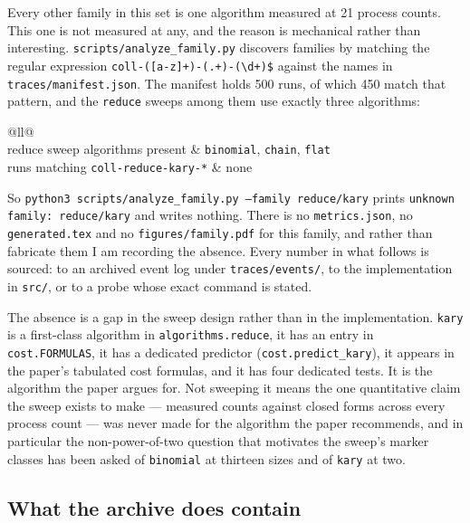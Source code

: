 \documentclass[11pt]{article}
\begin{document}
Every other family in this set is one algorithm measured at 21 process counts. This one is not
measured at any, and the reason is mechanical rather than interesting.
\texttt{scripts/analyze\_family.py} discovers families by matching the regular expression
\texttt{coll-([a-z]+)-(.+)-(\textbackslash d+)\$} against the names in
\texttt{traces/manifest.json}. The manifest holds 500 runs, of which 450 match that pattern,
and the \texttt{reduce} sweeps among them use exactly three algorithms:

\begin{center}\small
\begin{tabular}{@{}ll@{}}
\toprule
{} \\
\midrule
reduce sweep algorithms present & \texttt{binomial}, \texttt{chain}, \texttt{flat} \\
runs matching \texttt{coll-reduce-kary-*} & none \\
\bottomrule
\end{tabular}
\end{center}

So \texttt{python3 scripts/analyze\_family.py --family reduce/kary} prints
\texttt{unknown family: reduce/kary} and writes nothing. There is no \texttt{metrics.json}, no
\texttt{generated.tex} and no \texttt{figures/family.pdf} for this family, and rather than
fabricate them I am recording the absence. Every number in what follows is sourced: to an
archived event log under \texttt{traces/events/}, to the implementation in \texttt{src/}, or to
a probe whose exact command is stated.

The absence is a gap in the sweep design rather than in the implementation. \texttt{kary} is a
first-class algorithm in \texttt{algorithms.reduce}, it has an entry in
\texttt{cost.FORMULAS}, it has a dedicated predictor (\texttt{cost.predict\_kary}), it appears
in the paper's tabulated cost formulas, and it has four dedicated tests. It is the algorithm
the paper argues for. Not sweeping it means the one quantitative claim the sweep exists to
make --- measured counts against closed forms across every process count --- was never made for
the algorithm the paper recommends, and in particular the non-power-of-two question that
motivates the sweep's marker classes has been asked of \texttt{binomial} at thirteen sizes and
of \texttt{kary} at two.

\subsection*{What the archive does contain}
\end{document}
